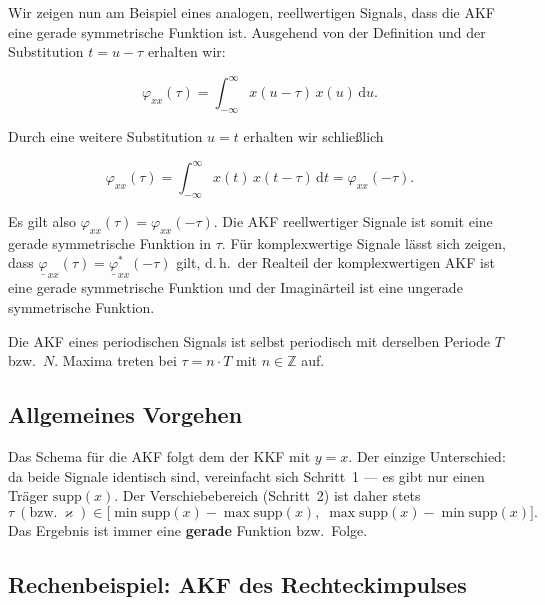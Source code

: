 \begin{beweis}
Wir zeigen nun am Beispiel eines analogen, reellwertigen Signals, dass die AKF eine gerade symmetrische Funktion ist. Ausgehend von der Definition und der Substitution $t = u - \tau$ erhalten wir:

$$
\varphi_{xx}(\tau) = \int_{-\infty}^{\infty} x(u-\tau)\,x(u)\,\mathrm{d}u.
$$

Durch eine weitere Substitution $u = t$ erhalten wir schließlich

$$
\varphi_{xx}(\tau) = \int_{-\infty}^{\infty} x(t)\,x(t-\tau)\,\mathrm{d}t = \varphi_{xx}(-\tau).
$$

Es gilt also $\varphi_{xx}(\tau) = \varphi_{xx}(-\tau)$. Die AKF reellwertiger Signale ist somit eine gerade symmetrische Funktion in $\tau$. Für komplexwertige Signale lässt sich zeigen, dass $\underline{\varphi}_{xx}(\tau) = \underline{\varphi}_{xx}^*(-\tau)$ gilt, d.\,h.\ der Realteil der komplexwertigen AKF ist eine gerade symmetrische Funktion und der Imaginärteil ist eine ungerade symmetrische Funktion.
\end{beweis}

Die AKF eines periodischen Signals ist selbst periodisch mit derselben Periode $T$
bzw.\ $N$. Maxima treten bei $\tau = n \cdot T$ mit $n \in \mathbb{Z}$ auf.


\subsection*{Allgemeines Vorgehen}

Das Schema für die AKF folgt dem der KKF mit $y = x$. Der einzige Unterschied:
da beide Signale identisch sind, vereinfacht sich Schritt~1 — es gibt nur einen
Träger $\mathrm{supp}(x)$. Der Verschiebebereich (Schritt~2) ist daher stets
$$
\tau\ (\text{bzw.}\ \varkappa) \in
\bigl[\min\mathrm{supp}(x) - \max\mathrm{supp}(x),\;
      \max\mathrm{supp}(x) - \min\mathrm{supp}(x)\bigr].
$$
Das Ergebnis ist immer eine \textbf{gerade} Funktion bzw.\ Folge.

\subsection*{Rechenbeispiel: AKF des Rechteckimpulses}

